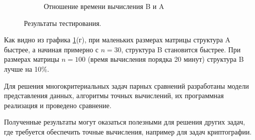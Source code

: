 \documentclass[specialist, substylefile = spbureport.rtx,
               subf,href,colorlinks=true, 12pt]{disser}
\begin{document}
\begin{figure}[h]
\begin{minipage}[t]{\columnwidth}
\begin{subfigure}[t]{0.475\linewidth}
            \caption{Отношение времени вычисления B и A}
        \end{subfigure}
        \caption{Результаты тестирования.}
        \label{fig:fig1}
        \end{minipage}
    \end{figure}


    Как видно из графика \ref{fig:fig1}(г), при маленьких размерах матрицы структура A быстрее, а начиная примерно с $n = 30$, структура B становится быстрее. При размерах матрицы $n = 100$ (время вычисления порядка 20 минут) структура B лучше на 10\%.




    \conclusion

    Для решения многокритериальных задач парных сравнений разработаны модели представления данных, алгоритмы точных вычислений, их программная реализация и проведено сравнение.

    Полученные результаты могут оказаться полезными для решения других задач, где требуется обеспечить точные вычисления, например для задач криптографии. 
    
    \renewcommand{\refname}{}
    \vspace{-25pt}
    
    




\end{document}
